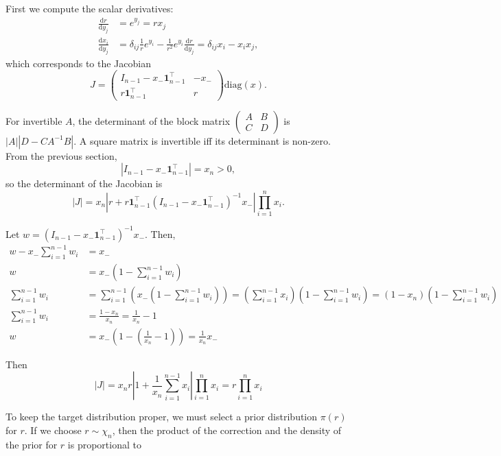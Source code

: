 \documentclass[11pt]{article}
\begin{document}
First we compute the scalar derivatives:
\[
\begin{aligned}
  \frac{\mathrm{d} r}{\mathrm{d} y_j}
  &= e^{y_j} = r x_j
  \\
  \frac{\mathrm{d} x_i}{\mathrm{d} y_j}
  &= \delta_{ij} \frac{1}{r} e^{y_i} - \frac{1}{r^2} e^{y_i} \frac{\mathrm{d} r}{\mathrm{d} y_j} = \delta_{ij} x_i - x_i x_j,
\end{aligned}
\]
which corresponds to the Jacobian
\[
  J = \begin{pmatrix}I_{n-1} - x_- \boldsymbol{1}_{n-1}^\top & -x_- \\
    r \boldsymbol{1}_{n-1}^\top & r \end{pmatrix} \mathrm{diag}(x).
\]

For invertible $A$, the determinant of the block matrix
$\begin{pmatrix}A & B \\ C & D\end{pmatrix}$ is $|A| |D-CA^{-1}B|$.  A
square matrix is invertible iff its determinant is non-zero.  From the
previous section,
\[
  |I_{n-1} - x_- \boldsymbol{1}_{n-1}^\top| = x_n > 0,
\]
so the determinant of the Jacobian is
\[
  |J| = x_n \left|r + r \boldsymbol{1}_{n-1}^\top (I_{n-1} - x_-
    \boldsymbol{1}_{n-1}^\top)^{-1} x_-\right|
  \prod_{i=1}^n x_i.
\]

Let $w = (I_{n-1} - x_- \boldsymbol{1}_{n-1}^\top)^{-1} x_-$. Then,
\[
\begin{aligned}
    w - x_- \sum_{i=1}^{n-1} w_i &= x_-\\
    w &= x_- \left(1 - \sum_{i=1}^{n-1} w_i\right)\\
    \sum_{i=1}^{n-1} w_i &= \sum_{i=1}^{n-1} \left( x_- (1 - \sum_{i=1}^{n-1} w_i) \right) = \left(\sum_{i=1}^{n-1} x_i \right) \left(1 - \sum_{i=1}^{n-1} w_i\right) = (1 - x_n)  \left(1 - \sum_{i=1}^{n-1} w_i\right)\\
    \sum_{i=1}^{n-1} w_i &= \frac{1 - x_n}{x_n} = \frac{1}{x_n} - 1\\
    w &= x_- \left(1 - \left(\frac{1}{x_n} - 1\right)\right) = \frac{1}{x_n} x_-
  \end{aligned}
\]

Then
\[
  |J| = x_n r \left|1 + \frac{1}{x_n}\sum_{i=1}^{n-1} x_i\right|
  \prod_{i=1}^n x_i = r \prod_{i=1}^n x_i
\]

To keep the target distribution proper, we must select a prior
distribution $\pi(r)$ for $r$.  If we choose $r \sim \chi_n$, then the
product of the correction and the density of the prior for $r$ is
proportional to
\end{document}

